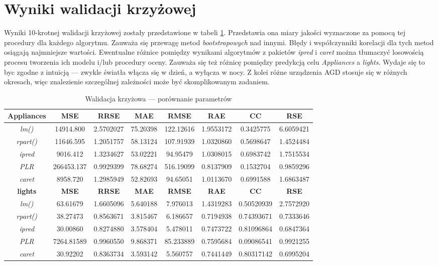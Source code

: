 \documentclass[a4paper,11pt,twoside]{mwrep}  %
\begin{document}
\pagebreak
\section{Wyniki walidacji krzyżowej}\label{sect:wyniki}
Wyniki 10-krotnej walidacji krzyżowej zostały przedstawione w tabeli \ref{table:wynikiKCV}. Przedstawia ona miary jakości wyznaczone za pomocą tej procedury dla każdego algorytmu. Zauważa się przewagę metod \textit{bootstrapowych} nad innymi. Błędy i współczynniki korelacji dla tych metod osiągają najmniejsze wartości. Ewentualne różnice pomiędzy wynikami algorytmów z pakietów \textit{ipred} i \textit{caret} można tłumaczyć losowością procesu tworzenia ich modelu i/lub procedury oceny. Zauważa się też różnicę pomiędzy predykcją celu \textit{Appliances} a \textit{lights}. Wydaje się to byc zgodne z intuicją --- zwykle światła włącza się w dzień, a wyłącza w nocy. Z kolei różne urządzenia AGD stosuje się w różnych okresach, więc znalezienie szczególnej zależności może być skomplikowanym zadaniem.   

\begin{table}[!h]  \centering
\caption{Walidacja krzyżowa --- porównanie parametrów}
\begin{tabular} { c  c  c  c  c  c  c  c} \hline \hline
    \textbf{Appliances} & \textbf{MSE} & \textbf{RRSE} & \textbf{MAE} & \textbf{RMSE} & \textbf{RAE} & \textbf{CC} & \textbf{RSE} \\ \hline
	\textit{lm()} & 14914.800 & 2.5702027	&  75.20398	& 122.12616	& 1.9553172	& 0.3425775 & 6.6059421 \\
	\textit{rpart()} & 11646.595 &	1.2051757	& 58.13124 & 107.91939 & 1.0320860	& 0.5698647 & 1.4524484 \\
	\textit{ipred} & 9016.412&	1.3234627&	53.02221&	94.95479&	1.0308015&	0.6983742&	1.7515534 \\
	\textit{PLR} & 266453.137	& 0.9929399 &	78.68274&	516.19099&	0.8137909&	0.1532704&	0.9859296 \\
	\textit{caret} & 8958.720& 	1.2985949&	52.82693&	94.65051&	1.0113670&	0.6991588&	1.6863487 \\
    \hline \hline
\textbf{lights} & \textbf{MSE} & \textbf{RRSE} & \textbf{MAE} & \textbf{RMSE} & \textbf{RAE} & \textbf{CC} & \textbf{RSE} \\ \hline
	\textit{lm()} & 63.61679 &	1.6605096 &	5.640188 &	7.976013 &	1.4319283 &	0.50520939 &	2.7572920 \\
	\textit{rpart()} & 38.27473 & 0.8563671 &	3.815467 &	6.186657 &	0.7194938 &	0.74393671 &	0.7333646 \\
	\textit{ipred} & 30.00860 &	0.8274880 &	3.578404 &	5.478011 &	0.7473722 &	0.81096864 &	0.6847364 \\
	\textit{PLR} & 7264.81589 &	0.9960550 &	9.868371 &	85.233889 &	0.7595684 &	0.09086541 &	0.9921255 \\
	\textit{caret} & 30.92202 &	0.8363734 &	3.593142 &	5.560757 &	0.7441449 &	0.80317142 &	0.6995204 \\
    
\end{tabular}
\label{table:wynikiKCV}
\end{table}
\end{document}
